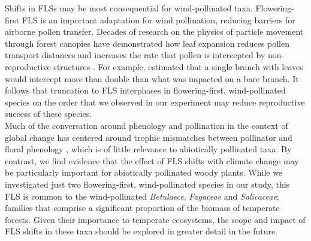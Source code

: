 \documentclass[11pt]{article}
\begin{document}
\noindent Shifts in FLSs may be most consequential for wind-pollinated taxa. Flowering-first FLS is an important adaptation for wind pollination, reducing barriers for airborne pollen transfer\citep{Rathcke_1985}. Decades of research on the physics of particle movement through forest canopies have demonstrated how leaf expansion reduces pollen transport distances and increases the rate that pollen is intercepted by non-reproductive structures \citep{Niklas1985,Milleron2012,Whitehead1969}. For example, \citet{Tauber1967} estimated that a single branch with leaves would intercept more than double than what was impacted on a bare branch. It follows that truncation to FLS interphases in flowering-first, wind-pollinated species on the order that we observed in our experiment may reduce reproductive success of these species.\\

\noindent Much of the conversation around phenology and pollination in the context of global change has centered around trophic mismatches between pollinator and floral phenology \citep{Gerard:2020aa}, which is of little relevance to abiotically pollinated taxa. By contrast, we find evidence that the effect of FLS shifts with climate change may be particularly important for abiotically pollinated woody plants. While we investigated just two flowering-first, wind-pollinated species in our study, this FLS is common to the wind-pollinated \textit{Betulaece}, \textit{Fagaceae} and \textit{Salicaceae}; families that comprise a significant proportion of the biomass of temperate forests. Given their importance to temperate ecosystems, the scope and impact of FLS shifts in these taxa should be explored in greater detail in the future.\\ %

\end{document}
